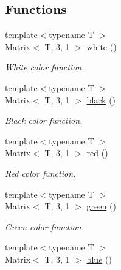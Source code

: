 \subsection*{Functions}
\begin{DoxyCompactItemize}
\item 
\hypertarget{group___primary_colors_gadc4ed12abc0d5a541d12226cb1b4aff3}{{\footnotesize template$<$typename T $>$ }\\Matrix$<$ T, 3, 1 $>$ \hyperlink{group___primary_colors_gadc4ed12abc0d5a541d12226cb1b4aff3}{white} ()}\label{group___primary_colors_gadc4ed12abc0d5a541d12226cb1b4aff3}

\begin{DoxyCompactList}\small\item\em White color function. \end{DoxyCompactList}\item 
\hypertarget{group___primary_colors_ga80b0871f1549bb1f83903fc572b0b6ef}{{\footnotesize template$<$typename T $>$ }\\Matrix$<$ T, 3, 1 $>$ \hyperlink{group___primary_colors_ga80b0871f1549bb1f83903fc572b0b6ef}{black} ()}\label{group___primary_colors_ga80b0871f1549bb1f83903fc572b0b6ef}

\begin{DoxyCompactList}\small\item\em Black color function. \end{DoxyCompactList}\item 
\hypertarget{group___primary_colors_gab84f59703c6ed9af4ad0a3a22fbc7dde}{{\footnotesize template$<$typename T $>$ }\\Matrix$<$ T, 3, 1 $>$ \hyperlink{group___primary_colors_gab84f59703c6ed9af4ad0a3a22fbc7dde}{red} ()}\label{group___primary_colors_gab84f59703c6ed9af4ad0a3a22fbc7dde}

\begin{DoxyCompactList}\small\item\em Red color function. \end{DoxyCompactList}\item 
\hypertarget{group___primary_colors_ga3636f495be874a77dcb70d98f6601abc}{{\footnotesize template$<$typename T $>$ }\\Matrix$<$ T, 3, 1 $>$ \hyperlink{group___primary_colors_ga3636f495be874a77dcb70d98f6601abc}{green} ()}\label{group___primary_colors_ga3636f495be874a77dcb70d98f6601abc}

\begin{DoxyCompactList}\small\item\em Green color function. \end{DoxyCompactList}\item 
\hypertarget{group___primary_colors_ga854c3a582fd097c73469f89b73e63915}{{\footnotesize template$<$typename T $>$ }\\Matrix$<$ T, 3, 1 $>$ \hyperlink{group___primary_colors_ga854c3a582fd097c73469f89b73e63915}{blue} ()}\label{group___primary_colors_ga854c3a582fd097c73469f89b73e63915}


\end{DoxyCompactItemize}
